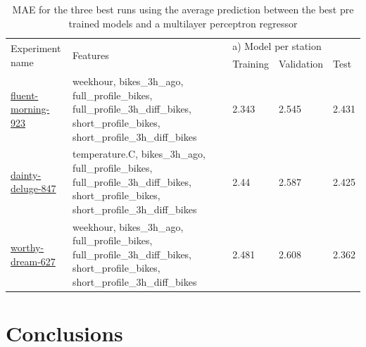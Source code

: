 \documentclass[a4paper]{article}
\begin{document}
    \begin{table}[h]
        \begin{tabularx}{\textwidth}{|X|p{}|XXX|}
            \hline
            \multirow{2}{*}{Experiment name} &
            \multirow{2}{*}{Features} &
            \multicolumn{3}{l|}{a) Model per station} \\ \cline{3-5}
            &
            &
            \multicolumn{1}{l|}{Training} &
            \multicolumn{1}{l|}{Validation} &
            Test \\ \hline
            \href{https://wandb.ai/idegen/mlp-2021/runs/2w4l1irf?workspace=user-idegen}{fluent-morning-923} &
            weekhour, bikes\_3h\_ago, full\_profile\_bikes, full\_profile\_3h\_diff\_bikes, short\_profile\_bikes, short\_profile\_3h\_diff\_bikes &
            \multicolumn{1}{l|}{2.343} &
            \multicolumn{1}{l|}{2.545} &
            2.431 \\ \hline
            \href{https://wandb.ai/idegen/mlp-2021/runs/u7jiadho?workspace=user-idegen}{dainty-deluge-847} &
            temperature.C, bikes\_3h\_ago, full\_profile\_bikes, full\_profile\_3h\_diff\_bikes, short\_profile\_bikes, short\_profile\_3h\_diff\_bikes &
            \multicolumn{1}{l|}{2.44} &
            \multicolumn{1}{l|}{2.587} &
            2.425 \\ \hline
            \href{https://wandb.ai/idegen/mlp-2021/runs/1bzsg4s4?workspace=user-idegen}{worthy-dream-627} &
            weekhour, bikes\_3h\_ago, full\_profile\_bikes, full\_profile\_3h\_diff\_bikes, short\_profile\_bikes, short\_profile\_3h\_diff\_bikes &
            \multicolumn{1}{l|}{2.481} &
            \multicolumn{1}{l|}{2.608} &
            2.362 \\ \hline
        \end{tabularx}
        \caption{MAE for the three best runs using the average prediction between the best pre trained models and a multilayer perceptron regressor}
        \label{tbl:phase3}
    \end{table}


    \section{Conclusions}\label{sec:conclusions}
    \subsection*{}
\end{document}
